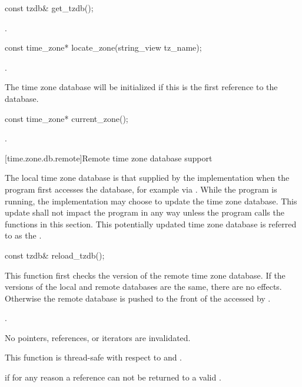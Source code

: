 %
\begin{itemdecl}
const tzdb& get_tzdb();
\end{itemdecl}

\begin{itemdescr}
\pnum
\returns {}.
\end{itemdescr}

%
\begin{itemdecl}
const time_zone* locate_zone(string_view tz_name);
\end{itemdecl}

\begin{itemdescr}
\pnum
\returns {}.

\pnum
\begin{note}
The time zone database will be initialized
if this is the first reference to the database.
\end{note}
\end{itemdescr}

%
\begin{itemdecl}
const time_zone* current_zone();
\end{itemdecl}

\begin{itemdescr}
\pnum
\returns {}.
\end{itemdescr}

[time.zone.db.remote]{Remote time zone database support}

\pnum
The local time zone database
is that supplied by the implementation
when the program first accesses the database,
for example via .
While the program is running,
the implementation may choose to update the time zone database.
This update shall not impact the program in any way
unless the program calls the functions in this section.
This potentially updated time zone database
is referred to as the .

%
\begin{itemdecl}
const tzdb& reload_tzdb();
\end{itemdecl}

\begin{itemdescr}
\pnum
\effects
This function first checks
the version of the remote time zone database.
If the versions of the local and remote databases are the same,
there are no effects.
Otherwise the remote database is pushed
to the front of the 
accessed by .

\pnum
\returns {}.

\pnum
\remarks
No pointers, references, or iterators are invalidated.

\pnum
\remarks
This function is thread-safe with respect to
 and .

\pnum
\throws
{} if for any reason
a reference can not be returned to a valid .
\end{itemdescr}

